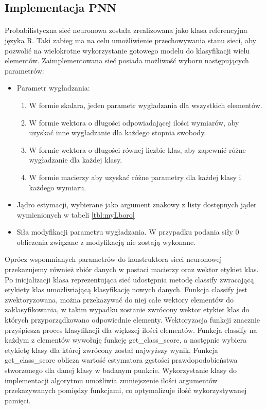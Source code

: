 \documentclass[a4paper,12pt,twoside]{article}
\begin{document}
\subsection{Implementacja PNN}
\paragraph{}
Probabilistyczna sieć neuronowa została zrealizowana jako klasa referencyjna języka R. Taki zabieg ma na celu umożliwienie przechowywania stanu sieci, aby pozwolić na wielokrotne wykorzystanie gotowego modelu do klasyfikacji wielu elementów. Zaimplementowana sieć posiada możliwość wyboru następujących parametrów: 
\begin{itemize}
\item Parametr wygładzania:
\begin{enumerate}
\item W formie skalara, jeden parametr wygładzania dla wszystkich elementów.
\item W formie wektora o długości odpowiadającej ilości wymiarów, aby uzyskać inne wygładzanie dla każdego stopnia swobody.
\item W formie wektora o długości równej liczbie klas, aby zapewnić różne wygładzanie dla każdej klasy.
\item W formie macierzy aby uzyskać różne parametry dla każdej klasy i każdego wymiaru. 
\end{enumerate}
\item Jądro estymacji, wybierane jako argument znakowy z listy dostępnych jąder wymienionych w tabeli \ref{tbl:myLboro}
\item Siła modyfikacji parametru wygładzania. W przypadku podania siły 0 obliczenia związane z modyfikacją nie zostają wykonane. 
\end{itemize}
Oprócz wspomnianych parametrów do konstruktora sieci neuronowej przekazujemy również zbiór danych w postaci macierzy oraz wektor etykiet klas. Po inicjalizacji klasa reprezentująca sieć udostępnia metodę classify zwracającą etykiety klas umożliwiającą klasyfikację nowych danych. Funkcja classify jest zwektoryzowana, można przekazywać do niej całe wektory elementów do zaklasyfikowania, w takim wypadku zostanie zwrócony wektor etykiet klas do których przyporządkowano odpowiednie elementy. Wektoryzacja funkcji znacznie przyśpiesza proces klasyfikacji dla większej ilości elementów. Funkcja classify na każdym z elementów wywołuję funkcję get\_class\_score, a następnie wybiera etykietę klasy dla której zwrócony został najwyższy wynik. Funkcja get\_class\_score oblicza wartość estymatora gęstości prawdopodobieństwa stworzonego dla danej klasy w badanym punkcie. Wykorzystanie klasy do implementacji algorytmu umożliwia zmniejszenie ilości argumentów przekazywanych pomiędzy funkcjami, co optymalizuje ilość wykorzystywanej pamięci. 
\end{document}
